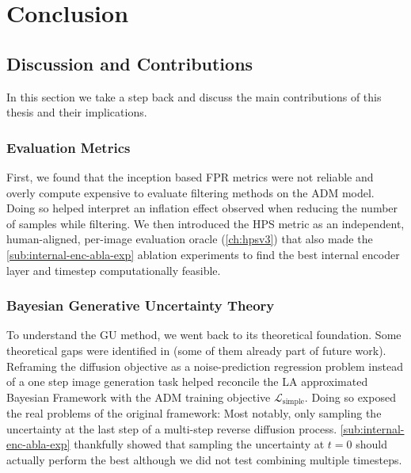 \chapter{Conclusion}
\label{ch:conclusion}


\section{Discussion and Contributions}

In this section we take a step back and discuss the main contributions of this thesis and their implications.

\subsection{Evaluation Metrics}
First, we found that the inception based \acs{FPR} metrics were not reliable and overly compute expensive to evaluate filtering methods on the \acs{ADM} model. Doing so helped interpret an inflation effect observed when reducing the number of samples while filtering.
We then introduced the \acs{HPS} metric as an independent, human-aligned, per-image evaluation oracle (\autoref{ch:hpsv3}) that also made the \autoref{sub:internal-enc-abla-exp} ablation experiments to find the best internal encoder layer and timestep computationally feasible.

\subsection{Bayesian Generative Uncertainty Theory}
To understand the \acs{GU} method, we went back to its theoretical foundation. Some theoretical gaps were identified in \cite{jazbec_generative_2025} (some of them already part of future work). Reframing the diffusion objective as a noise-prediction regression problem instead of a one step image generation task helped reconcile the \acs{LA} approximated Bayesian Framework with the \acs{ADM} training objective $\mathcal{L}_{\mathrm{simple}}$. 
Doing so exposed the real problems of the original framework: Most notably, only sampling the uncertainty at the last step of a multi-step reverse diffusion process. \autoref{sub:internal-enc-abla-exp} thankfully showed that sampling the uncertainty at $t=0$ should actually perform the best although we did not test combining multiple timesteps.

